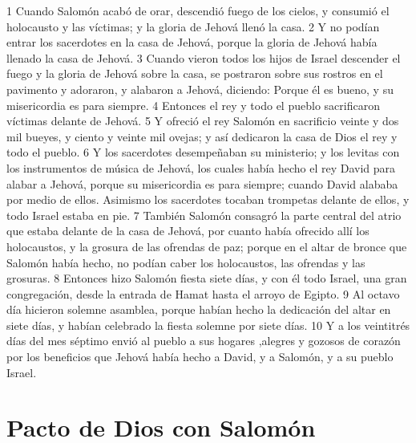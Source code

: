 1 Cuando Salomón acabó de orar, descendió fuego de los cielos, y consumió el holocausto y las víctimas; y la gloria de Jehová llenó la casa.
2 Y no podían entrar los sacerdotes en la casa de Jehová, porque la gloria de Jehová había llenado la casa de Jehová.
3 Cuando vieron todos los hijos de Israel descender el fuego y la gloria de Jehová sobre la casa, se postraron sobre sus rostros en el pavimento y adoraron, y alabaron a Jehová,  diciendo: Porque él es bueno, y su misericordia es para siempre. 
4 Entonces el rey y todo el pueblo sacrificaron víctimas delante de Jehová.
5 Y ofreció el rey Salomón en sacrificio veinte y dos mil bueyes, y ciento y veinte mil ovejas; y así dedicaron la casa de Dios el rey y todo el pueblo.
6 Y los sacerdotes desempeñaban su ministerio; y los levitas con los instrumentos de música de Jehová, los cuales había hecho el rey David para alabar a Jehová, porque su misericordia es para siempre; cuando David alababa por medio de ellos. Asimismo los sacerdotes tocaban trompetas delante de ellos, y todo Israel estaba en pie.
7 También Salomón consagró la parte central del atrio que estaba delante de la casa de Jehová, por cuanto había ofrecido allí los holocaustos, y la grosura de las ofrendas de paz; porque en el altar de bronce que Salomón había hecho, no podían caber los holocaustos, las ofrendas  y las grosuras.
8 Entonces hizo Salomón fiesta siete días, y con él todo Israel, una gran congregación, desde la entrada de Hamat hasta el arroyo de Egipto.
9 Al octavo día hicieron solemne asamblea, porque habían hecho la dedicación del altar en siete días, y habían celebrado la fiesta solemne por siete días.
10 Y  a  los veintitrés días del mes séptimo envió al pueblo  a  sus hogares ,alegres y gozosos de corazón por los beneficios que Jehová había hecho  a  David, y  a  Salomón, y  a  su pueblo Israel.

\section*{Pacto de Dios con Salomón}

